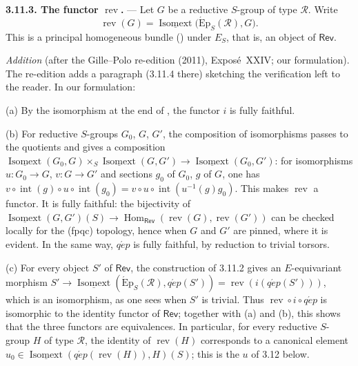 \medskip\noindent\textbf{3.11.3. The functor
\(\operatorname{rev}\).} ---
Let \(G\) be a reductive \(S\)-group of type \(\mathscr R\). Write
\[
  \operatorname{rev}(G)
  =
  \underline{\operatorname{Isomext}}
    \bigl(\operatorname{\acute{E}p}_S(\mathscr R),G\bigr).
\]
This is a principal homogeneous bundle () under \(E_S\),
that is, an object of \(\mathsf{Rev}\).

\medskip\noindent
\emph{Addition} (after the Gille--Polo re-edition (2011), Exposé~XXIV; our formulation). The re-edition adds a paragraph (3.11.4 there) sketching
the verification left to the reader. In our formulation:

(a) By the isomorphism at the end of , the functor \(i\) is fully
faithful.

(b) For reductive \(S\)-groups \(G_0\), \(G\), \(G'\), the composition of isomorphisms passes to the
quotients and gives a composition
\(\underline{\operatorname{Isomext}}(G_0,G)\times_S\underline{\operatorname{Isomext}}(G,G')\to
\underline{\operatorname{Isomext}}(G_0,G')\): for isomorphisms \(u\colon G_0\to G\),
\(v\colon G\to G'\) and sections \(g_0\) of \(G_0\), \(g\) of \(G\), one has
\(v\circ\operatorname{int}(g)\circ u\circ\operatorname{int}(g_0)
=v\circ u\circ\operatorname{int}(u^{-1}(g)g_0)\). This makes \(\operatorname{rev}\) a functor. It is
fully faithful: the bijectivity of
\(\underline{\operatorname{Isomext}}(G,G')(S)\to
\operatorname{Hom}_{\mathsf{Rev}}(\operatorname{rev}(G),\operatorname{rev}(G'))\) can be checked
locally for the \textup{(fpqc)} topology, hence when \(G\) and \(G'\) are pinned, where it is evident.
In the same way, \(q\acute{e}p\) is fully faithful, by reduction to trivial torsors.

(c) For every object \(S'\) of \(\mathsf{Rev}\), the construction of 3.11.2 gives an
\(E\)-equivariant morphism
\(S'\to\underline{\operatorname{Isomext}}(\operatorname{\acute{E}p}_S(\mathscr R),q\acute{e}p(S'))
=\operatorname{rev}(i(q\acute{e}p(S')))\), which is an isomorphism, as one sees when \(S'\) is
trivial. Thus \(\operatorname{rev}\circ i\circ q\acute{e}p\) is isomorphic to the identity functor of
\(\mathsf{Rev}\); together with (a) and (b), this shows that the three functors are equivalences.
In particular, for every reductive \(S\)-group \(H\) of type \(\mathscr R\), the identity of
\(\operatorname{rev}(H)\) corresponds to a canonical element
\(u_0\in\underline{\operatorname{Isomext}}(q\acute{e}p(\operatorname{rev}(H)),H)(S)\); this is the
\(u\) of 3.12 below.

